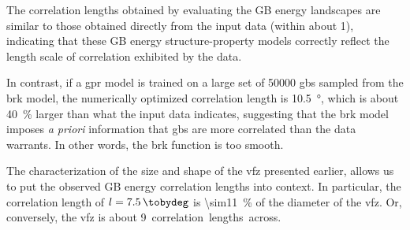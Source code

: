 \documentclass[final,twocolumn,12pt]{elsarticle}
\begin{document}
	The correlation lengths obtained by evaluating the GB energy landscapes are similar to those obtained directly from the input data (within about \SI{1}{\tobydeg}), indicating that these GB energy structure-property models correctly reflect the length scale of correlation exhibited by the data.
	
	
	In contrast, if a \gls{gpr} model is trained on a large set of \num{50000} \glspl{gb} sampled from the \gls{brk} model, the numerically optimized correlation length is \SI{10.5}{\degree}, which is about \SI{40}{\percent} larger than what the input data indicates, suggesting that the \gls{brk} model imposes \emph{a priori} information that \glspl{gb} are more correlated than the data warrants. In other words, the \gls{brk} function is too smooth.
	
	
	The characterization of the size and shape of the \gls{vfz} presented earlier, allows us to put the observed GB energy correlation lengths into context. In particular, the correlation length of $l = \SI{7.5}{\tobydeg}$ is \SI{\sim11}{\percent} of the diameter of the \gls{vfz}. Or, conversely, the \gls{vfz} is about \SI{9} correlation lengths across.
	
	
\end{document}
